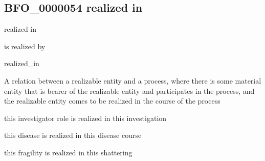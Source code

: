 \documentclass[letterpaper,10pt,english]{sphinxmanual}
\begin{document}
\begin{sphinxShadowBox}

\sphinxAtStartPar
{}
\end{sphinxShadowBox}
\begin{quote}

\ignorespaces \end{quote}


\subsection{BFO\_0000054 \sphinxhyphen{} realized in}
\label{\detokenize{doc-BFO_0000054:bfo-0000054-realized-in}}\label{\detokenize{doc-BFO_0000054:index-0}}\label{\detokenize{doc-BFO_0000054::doc}}
\begin{sphinxShadowBox}

\sphinxAtStartPar
realized in
\end{sphinxShadowBox}

\begin{sphinxShadowBox}

\sphinxAtStartPar
is realized by

\sphinxAtStartPar
realized\_in
\end{sphinxShadowBox}

\begin{sphinxShadowBox}

\sphinxAtStartPar
A relation between a realizable entity and a process, where there is some material entity that is bearer of the realizable entity and participates in the process, and the realizable entity comes to be realized in the course of the process
\end{sphinxShadowBox}

\begin{sphinxShadowBox}

\sphinxAtStartPar
this investigator role is realized in this investigation

\sphinxAtStartPar
this disease is realized in this disease course

\sphinxAtStartPar
this fragility is realized in this shattering
\end{sphinxShadowBox}
\end{document}

